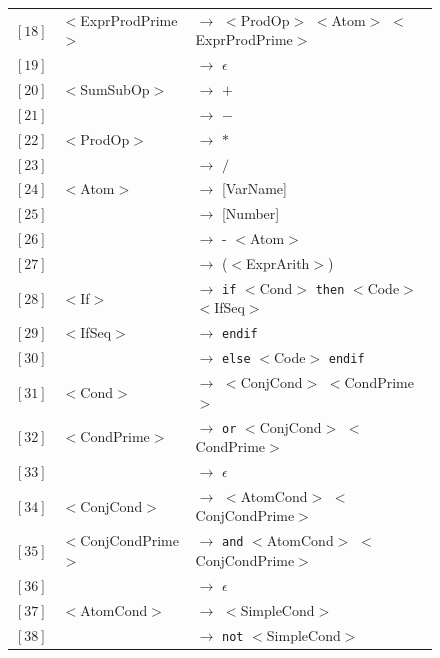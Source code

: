 \documentclass[letterpaper]{article}
\begin{document}
\begin{figure}
\begin{center}
\begin{tabular}{r l l}
                $[18]$ & $<$ExprProdPrime$>$ & $\rightarrow$
                $<$ProdOp$>$ $<$Atom$>$ $<$ExprProdPrime$>$ \\
                $[19]$ & & $\rightarrow$ $\epsilon$ \\

                $[20]$ & $<$SumSubOp$>$ & $\rightarrow$ $+$ \\
                $[21]$ & & $\rightarrow$ $-$ \\
                $[22]$ & $<$ProdOp$>$ & $\rightarrow$ $*$ \\
                $[23]$ & & $\rightarrow$ $/$ \\
                $[24]$ & $<$Atom$>$ & $\rightarrow$ [VarName] \\
                $[25]$ & & $\rightarrow$ [Number] \\
                $[26]$ & & $\rightarrow$ - $<$Atom$>$ \\
                $[27]$ & & $\rightarrow$ ($<$ExprArith$>$) \\

                $[28]$ & $<$If$>$ & $\rightarrow$
                \texttt{if} $<$Cond$>$ \texttt{then} $<$Code$>$ $<$IfSeq$>$ \\
                $[29]$ & $<$IfSeq$>$ & $\rightarrow$
                \texttt{endif} \\
                $[30]$ & & $\rightarrow$
                \texttt{else} $<$Code$>$ \texttt{endif} \\

                $[31]$ & $<$Cond$>$ & $\rightarrow$
                $<$ConjCond$>$ $<$CondPrime$>$ \\
                $[32]$ & $<$CondPrime$>$ & $\rightarrow$
                \texttt{or} $<$ConjCond$>$ $<$CondPrime$>$ \\
                $[33]$ & & $\rightarrow$ $\epsilon$ \\
                $[34]$ & $<$ConjCond$>$ & $\rightarrow$
                $<$AtomCond$>$ $<$ConjCondPrime$>$ \\
                $[35]$ & $<$ConjCondPrime$>$ & $\rightarrow$
                \texttt{and} $<$AtomCond$>$ $<$ConjCondPrime$>$ \\
                $[36]$ & & $\rightarrow$ $\epsilon$ \\
                $[37]$ & $<$AtomCond$>$ & $\rightarrow$ $<$SimpleCond$>$ \\
                $[38]$ & & $\rightarrow$ \texttt{not} $<$SimpleCond$>$ \\


\end{tabular}
\end{center}
\end{figure}
\end{document}
